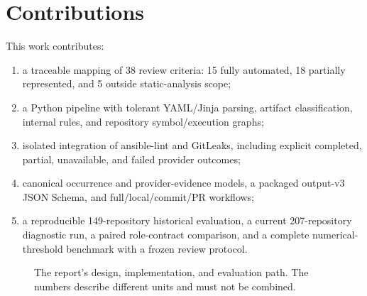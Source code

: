 \section{Contributions}
This work contributes:
\begin{enumerate}
  \item a traceable mapping of 38 review criteria: 15 fully automated, 18
    partially represented, and 5 outside static-analysis scope;
  \item a Python pipeline with tolerant YAML/Jinja parsing, artifact
    classification, internal rules, and repository symbol/execution graphs;
  \item isolated integration of ansible-lint and GitLeaks, including explicit
    completed, partial, unavailable, and failed provider outcomes;
  \item canonical occurrence and provider-evidence models, a packaged
    output-v3 JSON Schema, and full/local/commit/PR workflows;
  \item a reproducible 149-repository historical evaluation, a current
    207-repository diagnostic run, a paired role-contract comparison, and a
    complete numerical-threshold benchmark with a frozen review protocol.
\end{enumerate}

\begin{figure}[htbp]
\centering
{}
\caption{The report's design, implementation, and evaluation path. The numbers describe different units and must not be combined.}
\label{fig:report_roadmap}
\end{figure}

